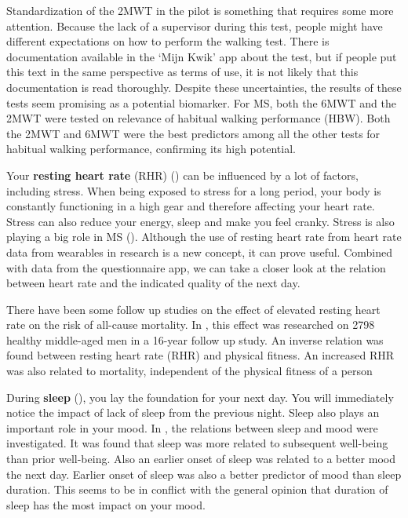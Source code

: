 Standardization of the 2MWT in the pilot is something that requires some more attention.
Because the lack of a supervisor during this test, people might have different expectations on how to perform the walking test.
There is documentation available in the `Mijn Kwik' app about the test, but if people put this text in the same perspective as terms of use, it is not likely that this documentation is read thoroughly.
Despite these uncertainties, the results of these tests seem promising as a potential biomarker.
For MS, both the 6MWT and the 2MWT \cite{gijbels2010predicting} were tested on relevance of habitual walking performance (HBW).
Both the 2MWT and 6MWT were the best predictors among all the other tests for habitual walking performance, confirming its high potential.

Your \textbf{resting heart rate} (RHR) () can be influenced by a lot of factors, including stress.
When being exposed to stress for a long period, your body is constantly functioning in a high gear and therefore affecting your heart rate.
Stress can also reduce your energy, sleep and make you feel cranky.
Stress is also playing a big role in MS ().
Although the use of resting heart rate from heart rate data from wearables in research is a new concept, it can prove useful.
Combined with data from the questionnaire app, we can take a closer look at the relation between heart rate and the indicated quality of the next day.

There have been some follow up studies on the effect of elevated resting heart rate on the risk of all-cause mortality.
In \cite{jensen2013elevated}, this effect was researched on 2798 healthy middle-aged men in a 16-year follow up study.
An inverse relation was found between resting heart rate (RHR) and physical fitness.
An increased RHR was also related to mortality, independent of the physical fitness of a person

During \textbf{sleep} (), you lay the foundation for your next day.
You will immediately notice the impact of lack of sleep from the previous night.
Sleep also plays an important role in your mood.
In \cite{totterdell1994associations}, the relations between sleep and mood were investigated.
It was found that sleep was more related to subsequent well-being than prior well-being.
Also an earlier onset of sleep was related to a better mood the next day. 
Earlier onset of sleep was also a better predictor of mood than sleep duration.
This seems to be in conflict with the general opinion that duration of sleep has the most impact on your mood.

